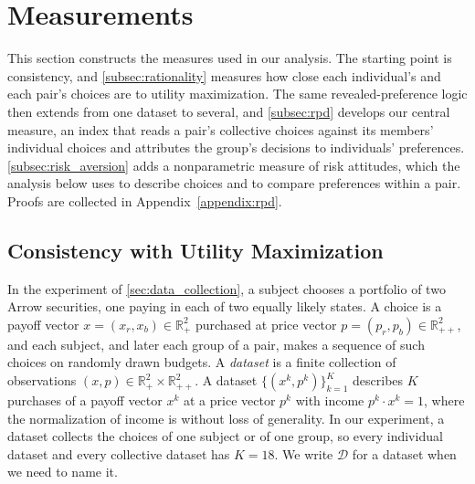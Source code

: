 \documentclass[11 pt]{article}
\begin{document}

\section{Measurements}\label{sec:measurement}

This section constructs the measures used in our analysis. The starting point is consistency, and \autoref{subsec:rationality} measures how close each individual's and each pair's choices are to utility maximization. The same revealed-preference logic then extends from one dataset to several, and \autoref{subsec:rpd} develops our central measure, an index that reads a pair's collective choices against its members' individual choices and attributes the group's decisions to individuals' preferences. \autoref{subsec:risk_aversion} adds a nonparametric measure of risk attitudes, which the analysis below uses to describe choices and to compare preferences within a pair. Proofs are collected in Appendix~\ref{appendix:rpd}.

\subsection{Consistency with Utility Maximization}\label{subsec:rationality}

In the experiment of \autoref{sec:data_collection}, a subject chooses a portfolio of two Arrow securities, one paying in each of two equally likely states. A choice is a payoff vector $x = (x_r, x_b) \in \mathbb{R}^2_{+}$ purchased at price vector $p = (p_r, p_b) \in \mathbb{R}^2_{++}$, and each subject, and later each group of a pair, makes a sequence of such choices on randomly drawn budgets. A \emph{dataset} is a finite collection of observations $(x, p) \in \mathbb{R}^2_{+} \times \mathbb{R}^2_{++}$. A dataset $\{ (x^{k}, p^{k}) \}_{k=1}^{K}$ describes $K$ purchases of a payoff vector $x^{k}$ at a price vector $p^{k}$ with income $p^{k} \cdot x^{k} = 1$, where the normalization of income is without loss of generality. In our experiment, a dataset collects the choices of one subject or of one group, so every individual dataset and every collective dataset has $K = 18$. We write $\mathcal{D}$ for a dataset when we need to name it.
\end{document}
